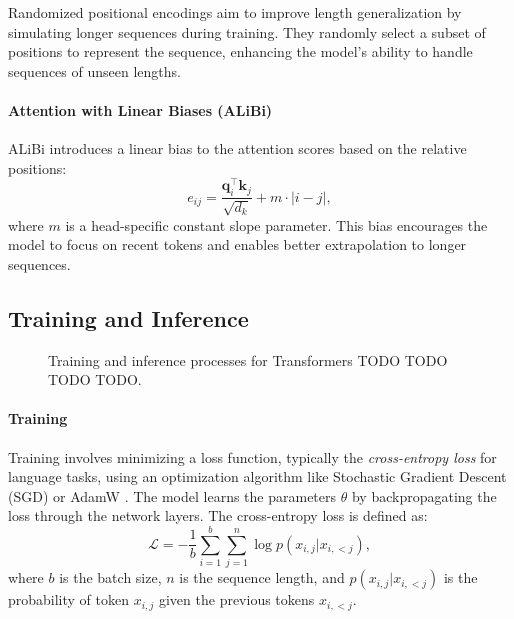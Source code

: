 Randomized positional encodings \cite{ruoss_randomized_2023} aim to improve length generalization by simulating longer sequences during training. They randomly select a subset of positions to represent the sequence, enhancing the model's ability to handle sequences of unseen lengths.

\paragraph{Attention with Linear Biases (ALiBi)}\label{subsec:alibi}

ALiBi \cite{press_train_2021} introduces a linear bias to the attention scores based on the relative positions:
\begin{equation*}
    e_{ij} = \frac{\mathbf{q}_i^\top \mathbf{k}_j}{\sqrt{d_k}} + m \cdot |i - j|,
\end{equation*}
where $m$ is a head-specific constant slope parameter. This bias encourages the model to focus on recent tokens and enables better extrapolation to longer sequences.

\subsection{Training and Inference}\label{subsec:training_inference}



\begin{figure}[h!]
    \centering


    \caption{Training and inference processes for Transformers TODO TODO TODO TODO.}
    \label{fig:transformer_training_inference}
\end{figure}

\paragraph{Training}

Training involves minimizing a loss function, typically the \emph{cross-entropy loss} for language tasks, using an optimization algorithm like Stochastic Gradient Descent (SGD) or AdamW \parencite{loshchilov_decoupled_2018}. The model learns the parameters $\theta$ by backpropagating the loss through the network layers. The cross-entropy loss is defined as:
\begin{equation*}
    \mathcal{L} = -\frac{1}{b} \sum_{i=1}^{b} \sum_{j=1}^{n} \log p(x_{i,j} | x_{i,<j}),
\end{equation*}
where $b$ is the batch size, $n$ is the sequence length, and $p(x_{i,j} | x_{i,<j})$ is the probability of token $x_{i,j}$ given the previous tokens $x_{i,<j}$.

